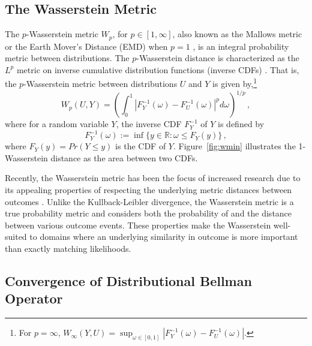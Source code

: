 \documentclass[letterpaper]{article}
\begin{document}
\subsection{The Wasserstein Metric}

The $p$-Wasserstein metric $W_p$, for $p \in [1, \infty]$, also known as the Mallows metric \cite{bickel81asymptotic} or the Earth Mover's Distance (EMD) when $p=1$ \cite{levina2001earth}, is an integral probability metric between distributions.
The $p$-Wasserstein distance is characterized as the $L^p$ metric on inverse cumulative distribution functions (inverse CDFs) \cite{muller1997integral}. That is, the $p$-Wasserstein metric between distributions $U$ and $Y$ is given by,\footnote{For $p = \infty$, $W_\infty(Y, U) = \sup_{\omega \in [0, 1]} |F_Y^{-1}(\omega) - F_U^{-1}(\omega)|$.}
\begin{equation}
    W_p(U, Y) = \left( \int_0^1 |F_Y^{-1}(\omega) - F_U^{-1}(\omega)|^p d\omega \right)^{1/p} \, ,
\end{equation}
where for a random variable $Y$, the inverse CDF $F^{-1}_Y$ of $Y$ is defined by
\begin{equation}\label{eqn:quantile}
    F^{-1}_Y(\omega) := \inf \{ y \in \mathbb{R} : \omega \le F_Y(y) \} \, ,
\end{equation}
where $F_Y(y) = Pr(Y \leq y)$ is the CDF of $Y$. Figure~\ref{fig:wmin} illustrates the 1-Wasserstein distance as the area between two CDFs.

Recently, the Wasserstein metric has been the focus of increased research due to its appealing properties of respecting the underlying metric distances between outcomes \cite{wgan,bellemare17cramer}. 
Unlike the Kullback-Leibler divergence, the Wasserstein metric is a true probability metric and considers both the probability of and the distance between various outcome events. These properties make the Wasserstein well-suited to domains where an underlying similarity in outcome is more important than exactly matching likelihoods.

\subsection{Convergence of Distributional Bellman Operator}
\end{document}
